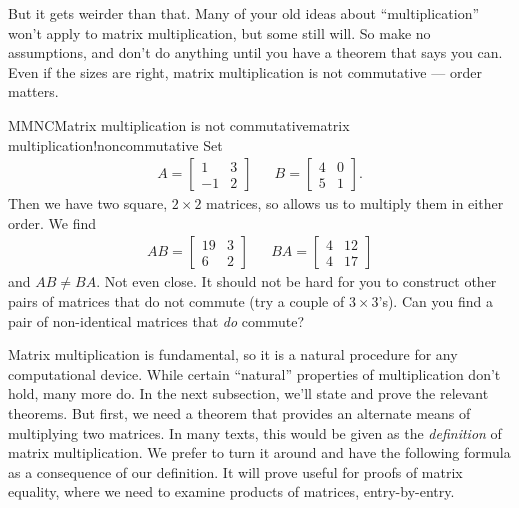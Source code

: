 But it gets weirder than that.  Many of your old ideas about ``multiplication'' won't apply to matrix multiplication, but some still will.  So make no assumptions, and don't do anything until you have a theorem that says you can.  Even if the sizes are right, matrix multiplication is not commutative --- order matters.
%
\begin{example}{MMNC}{Matrix multiplication is not commutative}{matrix multiplication!noncommutative}
Set
%
\begin{align*}
A=
\begin{bmatrix}
1 & 3\\
-1 & 2
\end{bmatrix}
&&
B=
\begin{bmatrix}
4&0\\
5&1
\end{bmatrix}.
\end{align*}
%
Then we have two square, $2\times 2$ matrices, so  allows us to multiply them in either order.  We find
%
\begin{align*}
AB=
\begin{bmatrix}
19 & 3\\
6 & 2
\end{bmatrix}
&&
BA=
\begin{bmatrix}
4 & 12\\
4 & 17
\end{bmatrix}
\end{align*}
%
and $AB\neq BA$.  Not even close.  It should not be hard for you to construct other pairs of matrices that do not commute (try a couple of $3\times 3$'s).  Can you find a pair of non-identical matrices that {\em do} commute?
%
\end{example}
%
{Matrix multiplication is fundamental, so it is a natural procedure for any computational device.}
{%
%
}{%
%
}
%
%
While certain ``natural'' properties of multiplication don't hold, many more do.  In the next subsection, we'll state and prove the relevant theorems.  But first, we need a theorem that provides an alternate means of multiplying two matrices.  In many texts, this would be given as the {\em definition} of matrix multiplication.  We prefer to turn it around and have the following formula as a consequence of our definition.  It will prove useful for proofs of matrix equality, where we need to examine products of matrices, entry-by-entry.
